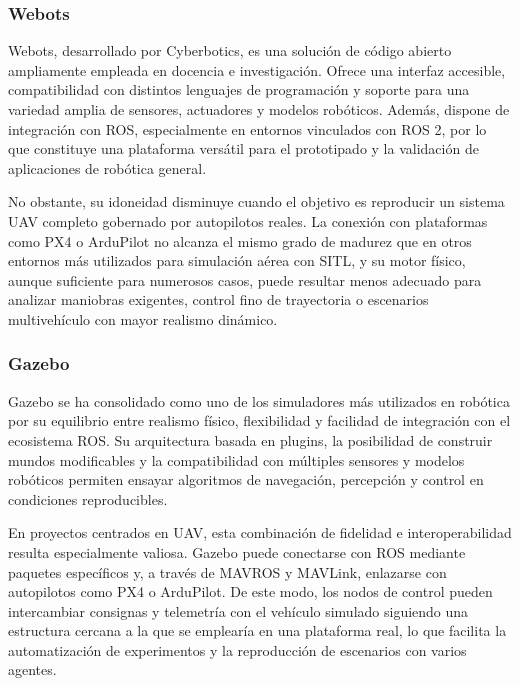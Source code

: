 \subsubsection{Webots}

Webots, desarrollado por Cyberbotics, es una solución de código abierto ampliamente empleada en docencia e investigación. Ofrece una interfaz accesible, compatibilidad con distintos lenguajes de programación y soporte para una variedad amplia de sensores, actuadores y modelos robóticos. Además, dispone de integración con ROS, especialmente en entornos vinculados con ROS 2, por lo que constituye una plataforma versátil para el prototipado y la validación de aplicaciones de robótica general.

\vspace{0.4cm}

No obstante, su idoneidad disminuye cuando el objetivo es reproducir un sistema UAV completo gobernado por autopilotos reales. La conexión con plataformas como PX4 o ArduPilot no alcanza el mismo grado de madurez que en otros entornos más utilizados para simulación aérea con SITL, y su motor físico, aunque suficiente para numerosos casos, puede resultar menos adecuado para analizar maniobras exigentes, control fino de trayectoria o escenarios multivehículo con mayor realismo dinámico.

\subsubsection{Gazebo}

Gazebo se ha consolidado como uno de los simuladores más utilizados en robótica por su equilibrio entre realismo físico, flexibilidad y facilidad de integración con el ecosistema ROS. Su arquitectura basada en plugins, la posibilidad de construir mundos modificables y la compatibilidad con múltiples sensores y modelos robóticos permiten ensayar algoritmos de navegación, percepción y control en condiciones reproducibles.

\vspace{0.4cm}

En proyectos centrados en UAV, esta combinación de fidelidad e interoperabilidad resulta especialmente valiosa. Gazebo puede conectarse con ROS mediante paquetes específicos y, a través de MAVROS y MAVLink, enlazarse con autopilotos como PX4 o ArduPilot. De este modo, los nodos de control pueden intercambiar consignas y telemetría con el vehículo simulado siguiendo una estructura cercana a la que se emplearía en una plataforma real, lo que facilita la automatización de experimentos y la reproducción de escenarios con varios agentes.

